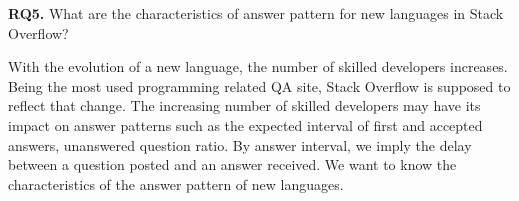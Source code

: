 \noindent  \textbf{RQ5.} What are the characteristics of answer pattern for new languages in Stack Overflow?

\indent With the evolution of a new language, the number of skilled developers increases. Being the most used programming related QA site, Stack Overflow is supposed to reflect that change. The increasing number of skilled developers may have its impact on answer patterns such as the expected interval of first and accepted answers, unanswered question ratio. By answer interval, we imply the delay between a question posted and an answer received. We want to know the characteristics of the answer pattern of new languages.



\iffalse


\noindent  \textbf{RQ6.} Is there any change over time in topics of Stack Overflow questions with the growth of the relevant language?

\indent Evolution of a language has many phases. These phases must have their footprint in the topics of the questions asked by the developers of the new languages. Hence, we want to know the topics of the questions asked by developers with respect to a timeline so that we can identify those phases.

\noindent \textbf{RQ7:} \emph{How do developers respond to the release of a new version of a language?}

\indent A new release of a language comes with a new and updated feature set. These updated or new features must have some impact over developer community. It may trigger new thread of question in Stack Overflow. We want to know the after effect of such release.
\fi
